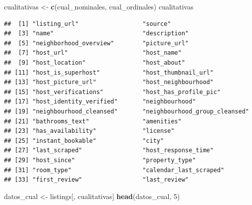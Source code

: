 \documentclass[
]{article}
\newenvironment{Shaded}{\begin{snugshade}}{\end{snugshade}}
\newcommand{\DecValTok}[1]{\textcolor[rgb]{0.00,0.00,0.81}{#1}}
\newcommand{\FunctionTok}[1]{\textcolor[rgb]{0.13,0.29,0.53}{\textbf{#1}}}
\newcommand{\NormalTok}[1]{#1}
\newcommand{\OtherTok}[1]{\textcolor[rgb]{0.56,0.35,0.01}{#1}}
\begin{document}
\begin{Shaded}
\begin{Highlighting}[]
\NormalTok{cualitativas }\OtherTok{\textless{}{-}} \FunctionTok{c}\NormalTok{(cual\_nominales, cual\_ordinales)}
\NormalTok{cualitativas}
\end{Highlighting}
\end{Shaded}

\begin{verbatim}
##  [1] "listing_url"                  "source"                      
##  [3] "name"                         "description"                 
##  [5] "neighborhood_overview"        "picture_url"                 
##  [7] "host_url"                     "host_name"                   
##  [9] "host_location"                "host_about"                  
## [11] "host_is_superhost"            "host_thumbnail_url"          
## [13] "host_picture_url"             "host_neighbourhood"          
## [15] "host_verifications"           "host_has_profile_pic"        
## [17] "host_identity_verified"       "neighbourhood"               
## [19] "neighbourhood_cleansed"       "neighbourhood_group_cleansed"
## [21] "bathrooms_text"               "amenities"                   
## [23] "has_availability"             "license"                     
## [25] "instant_bookable"             "city"                        
## [27] "last_scraped"                 "host_response_time"          
## [29] "host_since"                   "property_type"               
## [31] "room_type"                    "calendar_last_scraped"       
## [33] "first_review"                 "last_review"
\end{verbatim}

\begin{Shaded}
\begin{Highlighting}[]
\NormalTok{datos\_cual }\OtherTok{\textless{}{-}}\NormalTok{ listings[, cualitativas]}
\FunctionTok{head}\NormalTok{(datos\_cual, }\DecValTok{5}\NormalTok{)}
\end{Highlighting}
\end{Shaded}
\end{document}
